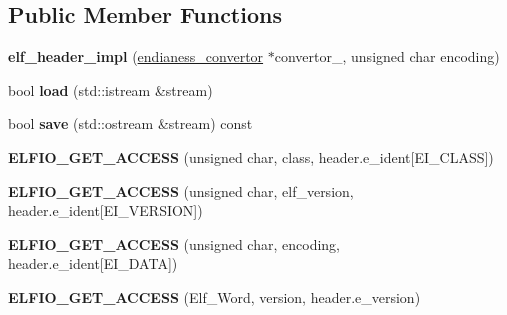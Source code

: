 \subsection*{Public Member Functions}
\begin{DoxyCompactItemize}
\item 
{\bfseries elf\+\_\+header\+\_\+impl} (\hyperlink{class_e_l_f_i_o_1_1endianess__convertor}{endianess\+\_\+convertor} $\ast$convertor\+\_\+, unsigned char encoding)\hypertarget{class_e_l_f_i_o_1_1elf__header__impl_a9b0d14138c2321771d6e58d0da2b8835}{}\label{class_e_l_f_i_o_1_1elf__header__impl_a9b0d14138c2321771d6e58d0da2b8835}

\item 
bool {\bfseries load} (std\+::istream \&stream)\hypertarget{class_e_l_f_i_o_1_1elf__header__impl_a5a94421ae7a4de702962db1f0d4cbc4a}{}\label{class_e_l_f_i_o_1_1elf__header__impl_a5a94421ae7a4de702962db1f0d4cbc4a}

\item 
bool {\bfseries save} (std\+::ostream \&stream) const \hypertarget{class_e_l_f_i_o_1_1elf__header__impl_afcabc009094d0328a95ddc2672dd774a}{}\label{class_e_l_f_i_o_1_1elf__header__impl_afcabc009094d0328a95ddc2672dd774a}

\item 
{\bfseries E\+L\+F\+I\+O\+\_\+\+G\+E\+T\+\_\+\+A\+C\+C\+E\+SS} (unsigned char, class, header.\+e\+\_\+ident\mbox{[}E\+I\+\_\+\+C\+L\+A\+SS\mbox{]})\hypertarget{class_e_l_f_i_o_1_1elf__header__impl_ae72b38f4d5cf6aa371a38b7dce94c827}{}\label{class_e_l_f_i_o_1_1elf__header__impl_ae72b38f4d5cf6aa371a38b7dce94c827}

\item 
{\bfseries E\+L\+F\+I\+O\+\_\+\+G\+E\+T\+\_\+\+A\+C\+C\+E\+SS} (unsigned char, elf\+\_\+version, header.\+e\+\_\+ident\mbox{[}E\+I\+\_\+\+V\+E\+R\+S\+I\+ON\mbox{]})\hypertarget{class_e_l_f_i_o_1_1elf__header__impl_a39341c9d4881f1315ff0005e2324e9dc}{}\label{class_e_l_f_i_o_1_1elf__header__impl_a39341c9d4881f1315ff0005e2324e9dc}

\item 
{\bfseries E\+L\+F\+I\+O\+\_\+\+G\+E\+T\+\_\+\+A\+C\+C\+E\+SS} (unsigned char, encoding, header.\+e\+\_\+ident\mbox{[}E\+I\+\_\+\+D\+A\+TA\mbox{]})\hypertarget{class_e_l_f_i_o_1_1elf__header__impl_a29197b16468fa1f7bb04d753a117ec3a}{}\label{class_e_l_f_i_o_1_1elf__header__impl_a29197b16468fa1f7bb04d753a117ec3a}

\item 
{\bfseries E\+L\+F\+I\+O\+\_\+\+G\+E\+T\+\_\+\+A\+C\+C\+E\+SS} (Elf\+\_\+\+Word, version, header.\+e\+\_\+version)\hypertarget{class_e_l_f_i_o_1_1elf__header__impl_a9eaa837636983deddf78526f828c03ee}{}\label{class_e_l_f_i_o_1_1elf__header__impl_a9eaa837636983deddf78526f828c03ee}


\end{DoxyCompactItemize}
